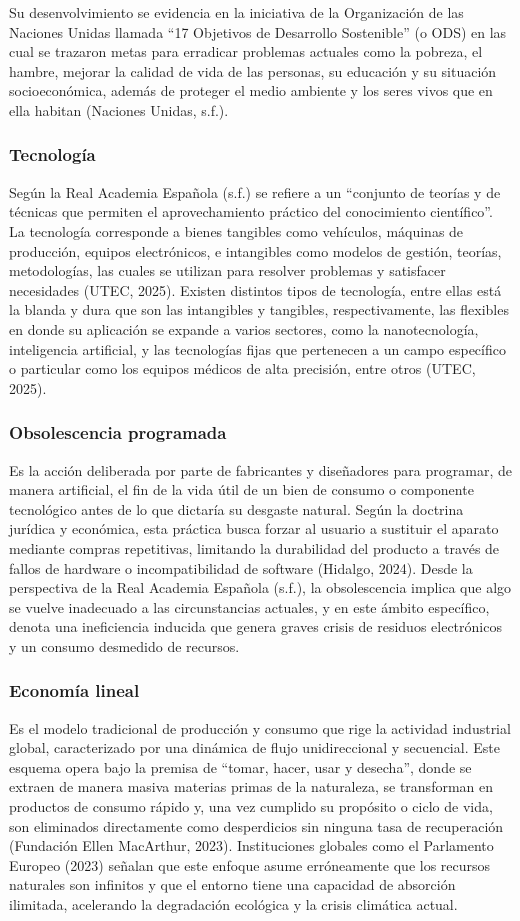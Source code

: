 \documentclass[stu,12pt,a4paper]{apa7}
\begin{document}
Su desenvolvimiento se evidencia en la iniciativa de la Organización de las Naciones Unidas llamada “17 Objetivos de Desarrollo Sostenible” (o ODS) en las cual se trazaron metas para erradicar problemas actuales como la pobreza, el hambre, mejorar la calidad de vida de las personas, su educación y su situación socioeconómica, además de proteger el medio ambiente y los seres vivos que en ella habitan (Naciones Unidas, s.f.).
    \subsubsection{Tecnología}
Según la Real Academia Española (s.f.) se refiere a un “conjunto de teorías y de técnicas que permiten el aprovechamiento práctico del conocimiento científico”. La tecnología corresponde a bienes tangibles como vehículos, máquinas de producción, equipos electrónicos, e intangibles como modelos de gestión, teorías, metodologías, las cuales se utilizan para resolver problemas y satisfacer necesidades (UTEC, 2025). Existen distintos tipos de tecnología, entre ellas está la blanda y dura que son las intangibles y tangibles, respectivamente, las flexibles en donde su aplicación se expande a varios sectores, como la nanotecnología, inteligencia artificial, y las tecnologías fijas que pertenecen a un campo específico o particular como los equipos médicos de alta precisión, entre otros (UTEC, 2025).
    \subsubsection{Obsolescencia programada}
Es la acción deliberada por parte de fabricantes y diseñadores para programar, de manera artificial, el fin de la vida útil de un bien de consumo o componente tecnológico antes de lo que dictaría su desgaste natural. Según la doctrina jurídica y económica, esta práctica busca forzar al usuario a sustituir el aparato mediante compras repetitivas, limitando la durabilidad del producto a través de fallos de hardware o incompatibilidad de software (Hidalgo, 2024). Desde la perspectiva de la Real Academia Española (s.f.), la obsolescencia implica que algo se vuelve inadecuado a las circunstancias actuales, y en este ámbito específico, denota una ineficiencia inducida que genera graves crisis de residuos electrónicos y un consumo desmedido de recursos.
    \subsubsection{Economía lineal}
Es el modelo tradicional de producción y consumo que rige la actividad industrial global, caracterizado por una dinámica de flujo unidireccional y secuencial. Este esquema opera bajo la premisa de ``tomar, hacer, usar y desecha'', donde se extraen de manera masiva materias primas de la naturaleza, se transforman en productos de consumo rápido y, una vez cumplido su propósito o ciclo de vida, son eliminados directamente como desperdicios sin ninguna tasa de recuperación (Fundación Ellen MacArthur, 2023). Instituciones globales como el Parlamento Europeo (2023) señalan que este enfoque asume erróneamente que los recursos naturales son infinitos y que el entorno tiene una capacidad de absorción ilimitada, acelerando la degradación ecológica y la crisis climática actual.
\end{document}
